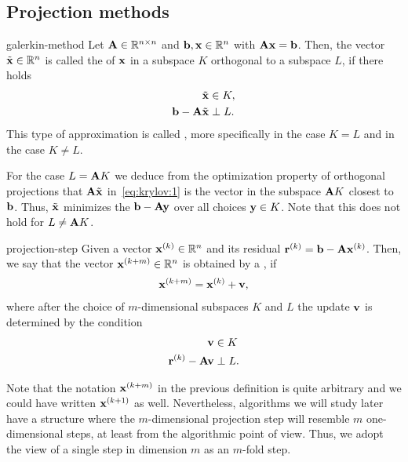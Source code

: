 \subsection{Projection methods}

\begin{Definition}{galerkin-method}
  Let $\mathbf A\in\mathbb R^{n\times n}$ and $\mathbf b, \mathbf x\in\mathbb R^n$ with $\mathbf A\mathbf x=\mathbf b$. Then,
  the vector $\tilde{\mathbf x}\in\mathbb R^n$ is called the  of $\mathbf x$ in a subspace $K$ orthogonal to a subspace
  $L$, if there holds
  \begin{align}
    \tilde{\mathbf x} &\in K,\\
    \mathbf b-\mathbf A\tilde{\mathbf x} &\perp L.
                         \label{eq:krylov:1}
  \end{align}
  This type of approximation is called , more
  specifically  in the case $K=L$ and
   in the case $K\neq L$.
\end{Definition}

\begin{remark}
  For the case $L=\mathbf A K$ we deduce from the optimization property of
  orthogonal projections that $\mathbf A\tilde {\mathbf x}$ in~\eqref{eq:krylov:1}
  is the vector in the subspace $\mathbf A K$ closest to $\mathbf b$. Thus,
  $\tilde{\mathbf x}$ minimizes the  $\mathbf b-\mathbf A\mathbf y$ over
  all choices $\mathbf y\in K$.
 Note that this does not hold for $L\neq \mathbf A K$.
\end{remark}

\begin{Definition}{projection-step}
  Given a vector $\mathbf x^{(k)}\in\mathbb R^n$ and its residual
  $\mathbf r^{(k)}=\mathbf b-\mathbf A\mathbf x^{(k)}$. Then, we say that the vector
  $\mathbf x^{(k+m)}\in\mathbb R^n$ is obtained by a , if
  \begin{gather}
    \mathbf x^{(k+m)} = \mathbf x^{(k)} + \mathbf v,
  \end{gather}
  where after the choice of $m$-dimensional subspaces $K$ and $L$ the update $\mathbf v$ is
  determined by the condition
  \begin{align}
    \mathbf v &\in K\\
    \mathbf r^{(k)} - \mathbf A\mathbf v &\perp L.
  \end{align}
\end{Definition}

Note that the notation $\mathbf x^{(k+m)}$ in the previous definition is
quite arbitrary and we could have written $\mathbf x^{(k+1)}$ as
well. Nevertheless, algorithms we will study later have a structure
where the $m$-dimensional projection step will resemble $m$
one-dimensional steps, at least from the algorithmic point of
view. Thus, we adopt the view of a single step in dimension $m$ as an
$m$-fold step.

